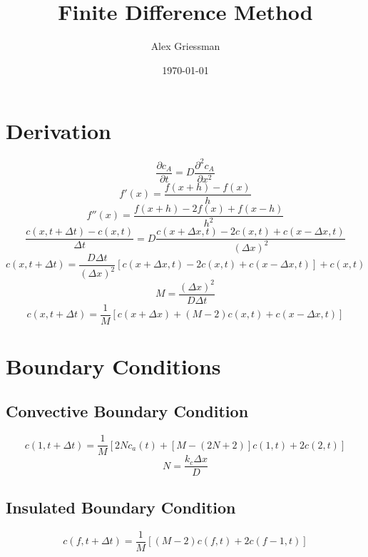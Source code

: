 \documentclass[11pt]{article}
\begin{document}

\title{Finite Difference Method}
\author{Alex Griessman}
\date{\today}
\maketitle

\section{Derivation}
\[\frac{\partial c_A}{\partial t} = D \frac{\partial^2 c_A}{\partial x^2}\]
\[f'(x) = \frac{f(x+h) - f(x)}{h}\]
\[f''(x) = \frac{f(x+h)-2f(x)+f(x-h)}{h^2}\]
\[\frac{c(x,t+\Delta t) - c(x,t)}{\Delta t} = D \frac{c(x+\Delta x, t) - 2c(x,t) + c(x-\Delta x,t)}{(\Delta x)^2}\]
\[c(x,t+\Delta t) = \frac{D \Delta t}{(\Delta x)^2}\left[ c(x+\Delta x,t) - 2c(x,t)+c(x-\Delta x, t)\right] + c(x,t)\]
\[ M = \frac{(\Delta x)^2}{D \Delta t}\]
\[c(x,t+\Delta t) = \frac{1}{M}\left[c(x+\Delta x) + (M-2)c(x,t) + c(x-\Delta x,t)\right]\]

\section{Boundary Conditions}
\subsection{Convective Boundary Condition}
\[c(1, t+\Delta t) = \frac{1}{M}\left[2 N c_a(t) + \left[M-(2N+2)\right]c(1,t) + 2c(2,t)\right]\]
\[N = \frac{k_c \Delta x}{D}\]
\subsection{Insulated Boundary Condition}
\[c(f,t+\Delta t) = \frac{1}{M}\left[(M-2)c(f,t) + 2 c(f-1,t)\right]\]
\end{document}
